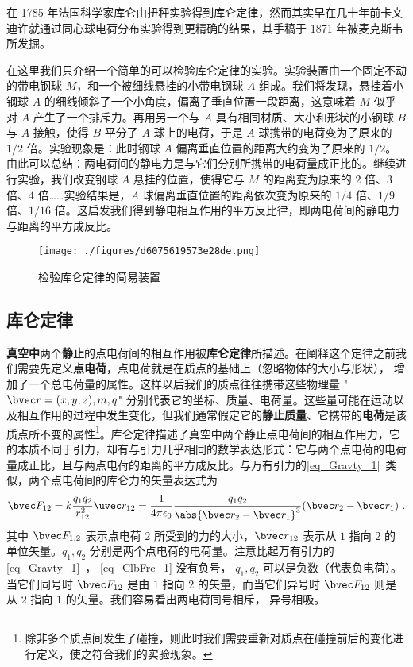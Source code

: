 

在 1785 年法国科学家库仑由扭秤实验得到库仑定律，然而其实早在几十年前卡文迪许就通过同心球电荷分布实验得到更精确的结果，其手稿于 1871 年被麦克斯韦所发掘。

在这里我们只介绍一个简单的可以检验库仑定律的实验。实验装置由一个固定不动的带电钢球 $M$，和一个被细线悬挂的小带电钢球 $A$ 组成。我们将发现，悬挂着小钢球 $A$ 的细线倾斜了一个小角度，偏离了垂直位置一段距离，这意味着 $M$ 似乎对 $A$ 产生了一个排斥力。再用另一个与 $A$ 具有相同材质、大小和形状的小钢球 $B$ 与 $A$ 接触，使得 $B$ 平分了 $A$ 球上的电荷，于是 $A$ 球携带的电荷变为了原来的 $1/2$ 倍。实验现象是：此时钢球 $A$ 偏离垂直位置的距离大约变为了原来的 $1/2$。由此可以总结：两电荷间的静电力是与它们分别所携带的电荷量成正比的。继续进行实验，我们改变钢球 $A$ 悬挂的位置，使得它与 $M$ 的距离变为原来的 $2$ 倍、$3$ 倍、$4$ 倍……实验结果是，$A$ 球偏离垂直位置的距离依次变为原来的 $1/4$ 倍、$1/9$ 倍、$1/16$ 倍。这启发我们得到静电相互作用的平方反比律，即两电荷间的静电力与距离的平方成反比。
\begin{figure}[ht]
\centering
\texttt{[image: ./figures/d6075619573e28de.png]}
\caption{检验库仑定律的简易装置} \label{fig_ClbFrc_1}
\end{figure}


\subsection{库仑定律}
\textbf{真空中}两个\textbf{静止}的点电荷间的相互作用被\textbf{库仑定律}所描述。在阐释这个定律之前我们需要先定义\textbf{点电荷}，点电荷就是在质点的基础上（忽略物体的大小与形状）， 增加了一个总电荷量的属性。这样以后我们的质点往往携带这些物理量 "$\bvec r=(x,y,z),m,q$" 分别代表它的坐标、质量、电荷量。这些量可能在运动以及相互作用的过程中发生变化，但我们通常假定它的\textbf{静止质量}、它携带的\textbf{电荷}是该质点所不变的属性\footnote{除非多个质点间发生了碰撞，则此时我们需要重新对质点在碰撞前后的变化进行定义，使之符合我们的实验现象。}。库仑定律描述了真空中两个静止点电荷间的相互作用力，它的本质不同于引力，却有与引力几乎相同的数学表达形式：它与两个点电荷的电荷量成正比，且与两点电荷的距离的平方成反比。与万有引力的\autoref{eq_Gravty_1}~类似，两个点电荷间的库仑力的矢量表达式为
\begin{equation}\label{eq_ClbFrc_1}
\bvec F_{12} = k\frac{q_1 q_2}{r_{12}^2} \uvec r_{12} = \frac{1}{4\pi\epsilon_0} \frac{q_1 q_2}{\abs{\bvec r_2 - \bvec r_1}^3}(\bvec r_2 - \bvec r_1)~.
\end{equation}
其中 $\bvec F_{1,2}$ 表示点电荷 $2$ 所受到的力的大小，$\hat{\bvec r}_{12}$ 表示从 $1$ 指向 $2$ 的单位矢量。$q_1, q_2$ 分别是两个点电荷的电荷量。注意比起万有引力的\autoref{eq_Gravty_1}~， \autoref{eq_ClbFrc_1} 没有负号， $q_1, q_2$ 可以是负数（代表负电荷）。当它们同号时 $\bvec F_{12}$ 是由 $1$ 指向 $2$ 的矢量，而当它们异号时 $\bvec F_{12}$ 则是从 $2$ 指向 $1$ 的矢量。我们容易看出两电荷同号相斥， 异号相吸。

